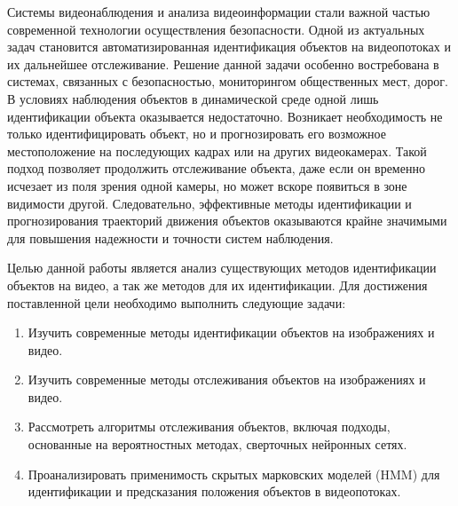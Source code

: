 
\usepackage{hyperref}



\setcounter{page}{2}
\nocite{*}

\renewcommand{\contentsname}{СОДЕРЖАНИЕ}
\tableofcontents


Системы видеонаблюдения и анализа видеоинформации стали важной частью современной технологии осуществления безопасности. Одной из актуальных задач становится автоматизированная идентификация объектов на видеопотоках и их дальнейшее отслеживание. Решение данной задачи особенно востребована в системах, связанных с безопасностью, мониторингом общественных мест, дорог. В условиях наблюдения объектов в динамической среде одной лишь идентификации объекта оказывается недостаточно. Возникает необходимость не только идентифицировать объект, но и прогнозировать его возможное местоположение на последующих кадрах или на других видеокамерах. Такой подход позволяет продолжить отслеживание объекта, даже если он временно исчезает из поля зрения одной камеры, но может вскоре появиться в зоне видимости другой. Следовательно, эффективные методы идентификации и прогнозирования траекторий движения объектов оказываются крайне значимыми для повышения надежности и точности систем наблюдения.

Целью данной работы является анализ существующих методов идентификации объектов на видео, а так же методов для их идентификации. Для достижения поставленной цели необходимо выполнить следующие задачи:
\begin{enumerate}
    \item Изучить современные методы идентификации объектов на изображениях и видео.
    \item Изучить современные методы отслеживания объектов на изображениях и видео.
    \item Рассмотреть алгоритмы отслеживания объектов, включая подходы, основанные на вероятностных методах, сверточных нейронных сетях.
    \item Проанализировать применимость скрытых марковских моделей (HMM) для идентификации и предсказания положения объектов в видеопотоках.
\end{enumerate}

